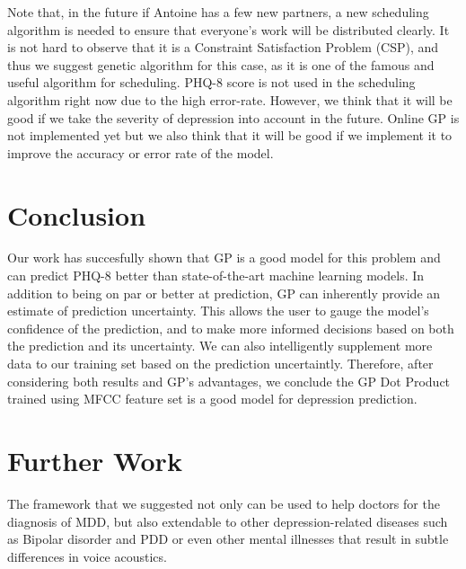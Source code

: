 \documentclass{article}
\begin{document}
	
	
	Note that, in the future if Antoine has a few new partners, a new scheduling algorithm is needed to ensure that everyone's work will be distributed clearly.
	It is not hard to observe that it is a Constraint Satisfaction Problem (CSP), and thus we suggest genetic algorithm for this case, 
	as it is one of the famous and useful algorithm for scheduling. 
	PHQ-8 score is not used in the scheduling algorithm right now due to the high error-rate. 
	However, we think that it will be good if we take the severity of depression into account in the future. 
	Online GP is not implemented yet but we also think that it will be good if we implement it to improve the accuracy or error rate of the model.
	
	\section{Conclusion}	
	Our work has succesfully shown that GP is a good model for this problem and can predict PHQ-8 better than state-of-the-art machine learning models. 
	In addition to being on par or better at prediction, GP can inherently provide an estimate of prediction uncertainty. 
	This allows the user to gauge the model's confidence of the prediction, and to make more informed decisions based on both the prediction and its uncertainty. 
	We can also intelligently supplement more data to our training set based on the prediction uncertaintly. 
	Therefore, after considering both results and GP's advantages, we conclude the GP Dot Product trained using MFCC feature set is a good model for 
	depression prediction.
	
	\section{Further Work}
	The framework that we suggested not only can be used to help doctors for the diagnosis of MDD, but also extendable to other depression-related 
	diseases such as Bipolar disorder and PDD or even other mental illnesses that result in subtle differences in voice acoustics. 

	
\end{document}

